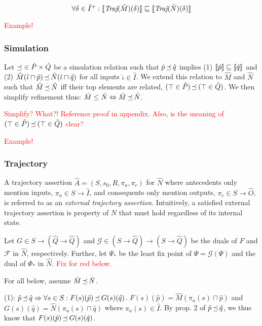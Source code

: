 \begin{equation*}
\forall \delta \in \hat I^{+} : \llbracket\textit{Traj}(\hat M)(\delta)\rrbracket \sqsubseteq \llbracket\textit{Traj}(\hat N)(\delta)\rrbracket
\end{equation*}

\textcolor{red}{Example!}

\subsubsection{Simulation} Let $\operatorname{\preceq} \in \hat P \times \hat Q$ be a simulation relation such that $\hat p \operatorname{\preceq} \hat q$ implies (1) $\llbracket\hat p\rrbracket \sqsubseteq \llbracket\hat q\rrbracket$ and (2) $\hat M(\hat \iota \sqcap \hat p) \operatorname{\preceq} \hat N(\hat \iota \sqcap \hat q)$ for all inputs $\hat \iota \in \hat I$. We extend this relation to $\hat M$ and $\hat N$ such that $\hat M \operatorname{\preceq} \hat N$ iff their top elements are related, $(\top \in \hat P) \operatorname{\preceq} \, (\top \in \hat Q)$. We then simplify refinement thus: $\hat M \leq \hat N \Leftrightarrow \hat M \operatorname{\preceq} \hat N$.

\textcolor{red}{Simplify? What?! Reference proof in appendix. Also, is the meaning of $(\top \in \hat P) \operatorname{\preceq} \, (\top \in \hat Q)$ clear?}

\textcolor{red}{Example!}


\subsubsection{Trajectory} A trajectory assertion $\hat A = (S,s_{0},R,\pi_{a},\pi_{c})$ for $\hat N$ where antecedents only mention inputs, $\pi_{a} \in S \rightarrow \hat I$, and consequents only mention outputs, $\pi_{c} \in S \rightarrow \hat O$, is referred to as an \textit{external trajectory assertion}. Intuitively, a satisfied external trajectory assertion is property of $N$ that must hold regardless of its internal state.

Let $G \in S \rightarrow (\hat Q \rightarrow \hat Q)$ and $\mathcal{G} \in (S \rightarrow \hat Q) \rightarrow (S \rightarrow \hat Q)$ be the duals of $F$ and $\mathcal{F}$ in $\hat N$, respectively. Further, let $\Psi_{*}$ be the least fix point of $\Psi = \mathcal{G}(\Psi)$ and the dual of $\Phi_{*}$ in $\hat N$. \textcolor{red}{Fix for red below.}

For all below, assume $\hat M \operatorname{\preceq} \hat N$.

(1): $\hat p \operatorname{\preceq} \hat q \Rightarrow \forall s \in S : F(s)(\hat p) \operatorname{\preceq} G(s)(\hat q)$. $F(s)(\hat p) = \hat M(\pi_{a}(s) \sqcap \hat p)$ and $G(s)(\hat q) = \hat N(\pi_{a}(s) \sqcap \hat q)$ where $\pi_{a}(s) \in \hat I$. By prop. 2 of $\hat p \operatorname{\preceq} \hat q$, we thus know that $F(s)(\hat p) \operatorname{\preceq} G(s)(\hat q)$.

